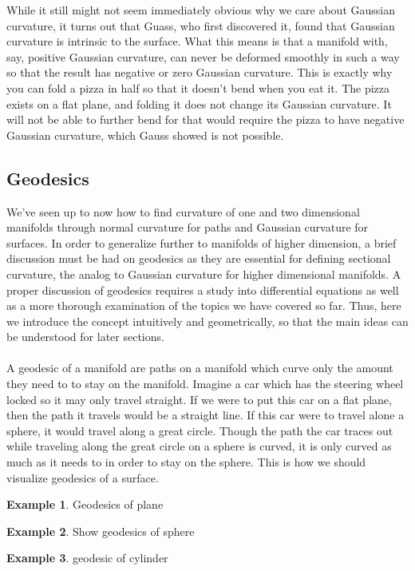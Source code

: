 \documentclass[]{article}
\newcommand\<{\ensuremath{\left\langle}}
\renewcommand\>{\ensuremath{\right\rangle}}
\theoremstyle{definition}
\theoremstyle{definition}
\newtheorem{example}{Example}[section]
\begin{document}
	While it still might not seem immediately obvious why we care about Gaussian curvature, it turns out that Guass, who first discovered it, found that Gaussian curvature is intrinsic to the surface. What this means is that a manifold with, say, positive Gaussian curvature, can never be deformed smoothly in such a way so that the result has negative or zero Gaussian curvature. This is exactly why you can fold a pizza in half so that it doesn't bend when you eat it. The pizza exists on a flat plane, and folding it does not change its Gaussian curvature. It will not be able to further bend for that would require the pizza to have negative Gaussian curvature, which Gauss showed is not possible.
	
	\subsection*{Geodesics}
	We've seen up to now how to find curvature of one and two dimensional manifolds through normal curvature for paths and Gaussian curvature for surfaces. In order to generalize further to manifolds of higher dimension, a brief discussion must be had on geodesics as they are essential for defining sectional curvature, the analog to Gaussian curvature for higher dimensional manifolds. A proper discussion of geodesics requires a study into differential equations as well as a more thorough examination of the topics we have covered so far. Thus, here we introduce the concept intuitively and geometrically, so that the main ideas can be understood for later sections.\\
	\\
	A geodesic of a manifold are paths on a manifold which curve only the amount they need to to stay on the manifold. Imagine a car which has the steering wheel locked so it may only travel straight. If we were to put this car on a flat plane, then the path it travels would be a straight line. If this car were to travel alone a sphere, it would travel along a great circle. Though the path the car traces out while traveling along the great circle on a sphere is curved, it is only curved as much as it needs to in order to stay on the sphere. This is how we should visualize geodesics of a surface.
	\begin{example}
		Geodesics of plane
	\end{example}
	\begin{example}
		Show geodesics of sphere
	\end{example}
	\begin{example}
		geodesic of cylinder
	\end{example}
		
\end{document}

